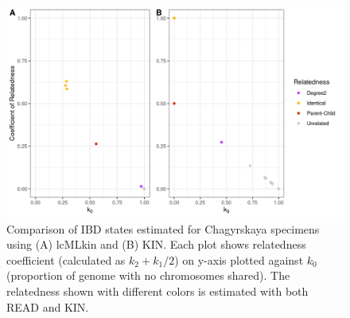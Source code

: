 \documentclass[12pt, letterpaper]{article}
\begin{document}
\begin{figure}[h!]
    \centering
    \includegraphics[width=18cm]{supplementary_info/plots/lcPlot.png}
    \caption{Comparison of IBD states estimated for Chagyrskaya specimens using (A) lcMLkin and (B) KIN. Each plot shows relatedness coefficient (calculated as $k_2+k_1/2$) on y-axis plotted against $k_0$ (proportion of genome with no chromosomes shared). The relatedness shown with different colors is estimated with both READ and KIN.}
    \label{figS6:Chagyrskaya_ibd}
\end{figure}
\end{document}
